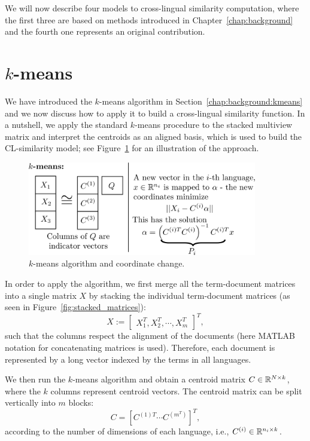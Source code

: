 We will now describe four models to cross-lingual similarity computation, where the first three are based on
methods introduced in Chapter~\ref{chap:background} and the fourth one represents an original contribution.
\section{$k$-means}\label{chap:crosslingual:kmeans}

We have introduced the $k$-means algorithm in Section~\ref{chap:background:kmeans} and we now discuss
how to apply it to build a cross-lingual similarity function. In a nutshell, we apply the standard
$k$-means procedure to the stacked multiview matrix and interpret the centroids as an aligned basis, which
is used to build the CL-similarity model; see Figure~\ref{fig:kmeans} for an illustration of the approach.

\begin{figure}[tbp]
\centering
\includegraphics[width=10cm]{figures/kmeans.pdf}
\caption{$k$-means algorithm and coordinate change.}
\label{fig:kmeans}
\end{figure}

In order to apply the algorithm, we first merge all the term-document matrices into a single matrix
$X$ by stacking the individual term-document matrices (as seen in Figure~\ref{fig:stacked_matrices}):
$$X := \begin{bmatrix}X_1^T ,X_2^T, \cdots, X_m^T \end{bmatrix}^T,$$
such that the columns respect the alignment of the documents (here MATLAB notation for concatenating
matrices is used). Therefore, each document is represented by a long vector indexed by the terms in all languages.

We then run the $k$-means algorithm and obtain a centroid matrix $C \in \mathbb{R}^{N \times k}$,
where the $k$ columns represent centroid vectors. The centroid matrix can be split vertically into $m$
blocks: $$C = [C^{(1)T} \cdots C^{(m^T)}]^T,$$ according to the number of dimensions of each language,
i.e., $C^{(i)} \in \mathbb{R}^{n_i \times k}$.

